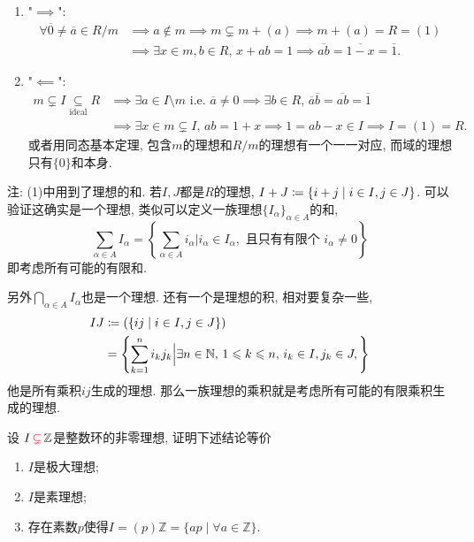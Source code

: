 \begin{solution}
    \begin{enumerate}[(1)]
        \item "$\implies$":
        \[
        \begin{aligned}
            \forall \overline{0} \neq \overline{a} \in R/m &\implies a \notin m \implies m \subsetneq m + (a) \implies m + (a) = R = (1)\\
            &\implies \exists x \in m, b \in R,\, x + ab = 1 \implies \overline{ab} = \overline{1 - x} = \overline{1}.
        \end{aligned}
        \]
        \item "$\impliedby$":
        \[
        \begin{aligned}
            m \subsetneq I \underset{\text{ideal}}{\subseteq} R &\implies \exists a \in I \setminus m \text{ i.e. } \overline{a} \neq 0 \implies \exists b \in R,\, \overline{a}\overline{b} = \overline{ab} = \overline{1}\\
            &\implies \exists x \in m \subsetneq I,\, ab = 1 + x \implies 1 = ab - x \in I \implies I = (1) = R.
        \end{aligned}
        \]
        或者用同态基本定理, 包含$m$的理想和$R/m$的理想有一个一一对应, 而域的理想只有$\{0\}$和本身.
    \end{enumerate}
注: (1)中用到了理想的和. 若$I, J$都是$R$的理想, $I + J \mathrel{\coloneqq} \{i + j \mid i \in I, j \in J\}$. 可以验证这确实是一个理想, 类似可以定义一族理想$\{I_\alpha\}_{\alpha \in A}$的和,
\[
    \sum_{\alpha \in A} I_\alpha = \left\{\sum_{\alpha \in A} i_\alpha \Big|i_\alpha \in I_\alpha, \text{ 且只有有限个 } i_\alpha \neq 0 \right\} 
\]
即考虑所有可能的有限和.

    另外$\bigcap_{\alpha \in A} I_\alpha$也是一个理想. 还有一个是理想的积, 相对要复杂一些,
\[
\begin{aligned}
    IJ &\mathrel{\coloneqq} (\{ij \mid i \in I, j \in J\})\\
    &= \left\{\sum_{k = 1}^{n} i_kj_k \Big| \exists n \in \mathbb{N},\, 1 \leqslant k \leqslant n,\, i_k \in I, j_k \in J, \right\}
\end{aligned}  
\]
他是所有乘积$ij$生成的理想. 那么一族理想的乘积就是考虑所有可能的有限乘积生成的理想.
\end{solution}

\begin{problem}
    设 $I \,\textcolor{red}{\subsetneq}\, \mathbb{Z}$是整数环的非零理想, 证明下述结论等价
\begin{enumerate}[(1)]
    \item $I$是极大理想;
    \item $I$是素理想;
    \item 存在素数$p$使得$I = (p)\mathbb{Z} = \{ap \mid \forall a \in \mathbb{Z}\}$.
\end{enumerate}
\end{problem}

